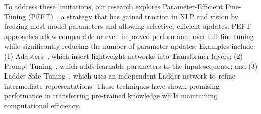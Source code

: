 
To address these limitations, our research explores Parameter-Efficient Fine-Tuning (PEFT)~\cite{houlsby2019parameter, jie2023fact, karimi2021compacter}, a strategy that has gained traction in NLP and vision by freezing most model parameters and allowing selective, efficient updates. PEFT approaches allow comparable or even improved performance over full fine-tuning while significantly reducing the number of parameter updates. Examples include (1) Adapters~\cite{houlsby2019parameter, chen2022adaptformer}, which insert lightweight networks into Transformer layers; (2) Prompt Tuning~\cite{li2021prefix, lester-etal-2021-power}, which adds learnable parameters to the input sequence; and (3) Ladder Side Tuning~\cite{sung2022lst}, which uses an independent Ladder network to refine intermediate representations. These techniques have shown promising performance in transferring pre-trained knowledge while maintaining computational efficiency.

